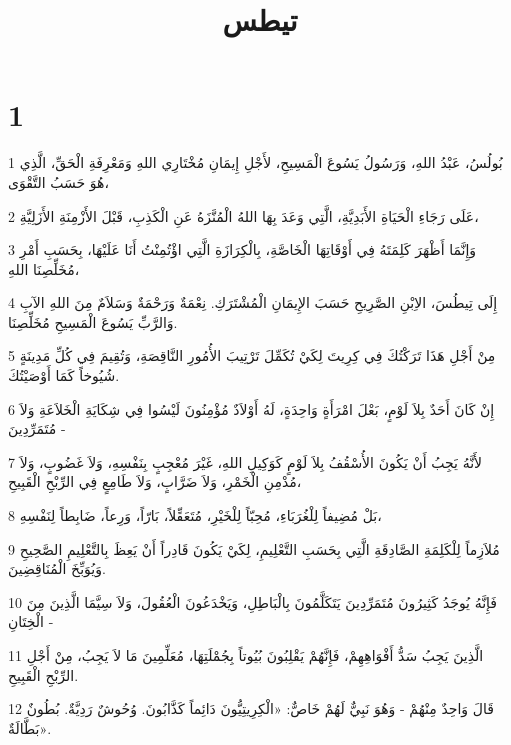 

\title{تيطس}


\chapter{1}

\par 1 بُولُسُ، عَبْدُ اللهِ، وَرَسُولُ يَسُوعَ الْمَسِيحِ، لأَجْلِ إِيمَانِ مُخْتَارِي اللهِ وَمَعْرِفَةِ الْحَقِّ، الَّذِي هُوَ حَسَبُ التَّقْوَى،
\par 2 عَلَى رَجَاءِ الْحَيَاةِ الأَبَدِيَّةِ، الَّتِي وَعَدَ بِهَا اللهُ الْمُنَّزَهُ عَنِ الْكَذِبِ، قَبْلَ الأَزْمِنَةِ الأَزَلِيَّةِ،
\par 3 وَإِنَّمَا أَظْهَرَ كَلِمَتَهُ فِي أَوْقَاتِهَا الْخَاصَّةِ، بِالْكِرَازَةِ الَّتِي اؤْتُمِنْتُ أَنَا عَلَيْهَا، بِحَسَبِ أَمْرِ مُخَلِّصِنَا اللهِ،
\par 4 إِلَى تِيطُسَ، الاِبْنِ الصَّرِيحِ حَسَبَ الإِيمَانِ الْمُشْتَرَكِ. نِعْمَةٌ وَرَحْمَةٌ وَسَلاَمٌ مِنَ اللهِ الآبِ وَالرَّبِّ يَسُوعَ الْمَسِيحِ مُخَلِّصِنَا.
\par 5 مِنْ أَجْلِ هَذَا تَرَكْتُكَ فِي كِرِيتَ لِكَيْ تُكَمِّلَ تَرْتِيبَ الأُمُورِ النَّاقِصَةِ، وَتُقِيمَ فِي كُلِّ مَدِينَةٍ شُيُوخاً كَمَا أَوْصَيْتُكَ.
\par 6 إِنْ كَانَ أَحَدٌ بِلاَ لَوْمٍ، بَعْلَ امْرَأَةٍ وَاحِدَةٍ، لَهُ أَوْلاَدٌ مُؤْمِنُونَ لَيْسُوا فِي شِكَايَةِ الْخَلاَعَةِ وَلاَ مُتَمَرِّدِينَ -
\par 7 لأَنَّهُ يَجِبُ أَنْ يَكُونَ الأُسْقُفُ بِلاَ لَوْمٍ كَوَكِيلِ اللهِ، غَيْرَ مُعْجِبٍ بِنَفْسِهِ، وَلاَ غَضُوبٍ، وَلاَ مُدْمِنِ الْخَمْرِ، وَلاَ ضَرَّابٍ، وَلاَ طَامِعٍ فِي الرِّبْحِ الْقَبِيحِ،
\par 8 بَلْ مُضِيفاً لِلْغُرَبَاءِ، مُحِبّاً لِلْخَيْرِ، مُتَعَقِّلاً، بَارّاً، وَرِعاً، ضَابِطاً لِنَفْسِهِ،
\par 9 مُلاَزِماً لِلْكَلِمَةِ الصَّادِقَةِ الَّتِي بِحَسَبِ التَّعْلِيمِ، لِكَيْ يَكُونَ قَادِراً أَنْ يَعِظَ بِالتَّعْلِيمِ الصَّحِيحِ وَيُوَبِّخَ الْمُنَاقِضِينَ.
\par 10 فَإِنَّهُ يُوجَدُ كَثِيرُونَ مُتَمَرِّدِينَ يَتَكَلَّمُونَ بِالْبَاطِلِ، وَيَخْدَعُونَ الْعُقُولَ، وَلاَ سِيَّمَا الَّذِينَ مِنَ الْخِتَانِ -
\par 11 الَّذِينَ يَجِبُ سَدُّ أَفْوَاهِهِمْ، فَإِنَّهُمْ يَقْلِبُونَ بُيُوتاً بِجُمْلَتِهَا، مُعَلِّمِينَ مَا لاَ يَجِبُ، مِنْ أَجْلِ الرِّبْحِ الْقَبِيحِ.
\par 12 قَالَ وَاحِدٌ مِنْهُمْ - وَهُوَ نَبِيٌّ لَهُمْ خَاصٌّ: «الْكِرِيتِيُّونَ دَائِماً كَذَّابُونَ. وُحُوشٌ رَدِيَّةٌ. بُطُونٌ بَطَّالَةٌ».
